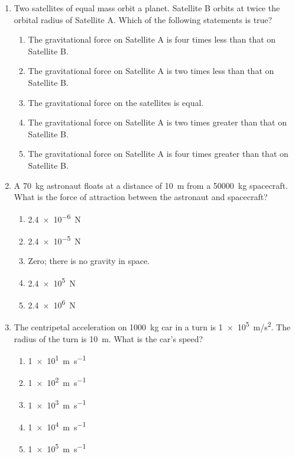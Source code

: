 \documentclass{../../../oss-apphys}
\begin{document}
\genheader


\genmultidirections

\gengravity

\raggedcolumns
\begin{multicols}{2}

  \begin{enumerate}[leftmargin=18pt]  
  \item Two satellites of equal mass orbit a planet. Satellite B orbits at twice
    the orbital radius of Satellite A. Which of the following statements is
    true?
    \begin{enumerate}[nosep,leftmargin=18pt,label=(\Alph*)]
    \item The gravitational force on Satellite A is four times less than that on
      Satellite B.
    \item The gravitational force on Satellite A is two times less than that on
      Satellite B.
    \item The gravitational force on the satellites is equal.
    \item The gravitational force on Satellite A is two times greater than that
      on Satellite B.
    \item The gravitational force on Satellite A is four times greater than that
      on Satellite B.
    \end{enumerate}
    \vspace{.8in}
    
  \item A \SI{70}{\kilo\gram} astronaut floats at a distance of \SI{10}{\metre}
    from a \SI{50000}{\kilo\gram} spacecraft. What is the force of attraction
    between the astronaut and spacecraft?
    \begin{enumerate}[nosep,leftmargin=18pt,label=(\Alph*)]
    \item\SI{2.4e-6}{\newton}
    \item\SI{2.4e-5}{\newton}
    \item Zero; there is no gravity in space.
    \item\SI{2.4e5}{\newton}
    \item\SI{2.4e6}{\newton}
    \end{enumerate}
    \vspace{.8in}
    
  \item The centripetal acceleration on \SI{1000}{\kilo\gram} car in a turn is
    \SI{1e5}{m/s^2}. The radius of the turn is \SI{10}{\metre}. What is the
    car's speed?
    \begin{enumerate}[nosep,leftmargin=18pt,label=(\Alph*)]
    \item\SI{1e1}{\metre\per\second}
    \item\SI{1e2}{\metre\per\second}
    \item\SI{1e3}{\metre\per\second}
    \item\SI{1e4}{\metre\per\second}
    \item\SI{1e5}{\metre\per\second}
    \end{enumerate}
    \columnbreak
    

\end{enumerate}
\end{multicols}
\end{document}
